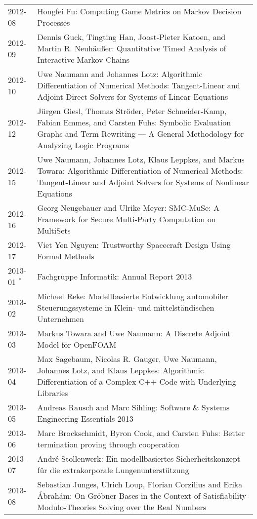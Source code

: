 \documentclass[color]{aib}
\begin{document}
\begin{longtable}{lp{11cm}}
2012-08 & Hongfei Fu:         Computing Game Metrics on Markov Decision Processes\\
2012-09 & Dennis Guck, Tingting Han, Joost-Pieter Katoen, and Martin R. Neuh\"{a}u\ss{}er:         Quantitative Timed Analysis of Interactive Markov Chains\\
2012-10 & Uwe Naumann and Johannes Lotz:         Algorithmic Differentiation of Numerical Methods: Tangent-Linear and Adjoint Direct Solvers for Systems of Linear Equations\\
2012-12 & J\"{u}rgen Giesl, Thomas Str\"{o}der, Peter Schneider-Kamp, Fabian Emmes, and Carsten Fuhs:         Symbolic Evaluation Graphs and Term Rewriting --- A General Methodology for Analyzing Logic Programs\\
2012-15 & Uwe Naumann, Johannes Lotz, Klaus Leppkes, and Markus Towara:         Algorithmic Differentiation of Numerical Methods: Tangent-Linear and Adjoint Solvers for Systems of Nonlinear Equations\\
2012-16 & Georg Neugebauer and Ulrike Meyer:         SMC-MuSe: A Framework for Secure Multi-Party Computation on MultiSets\\
2012-17 & Viet Yen Nguyen:         Trustworthy Spacecraft Design Using Formal Methods\\
2013-01 $^\ast$ &Fachgruppe Informatik:      Annual Report 2013\\
2013-02 & Michael Reke:         Modellbasierte Entwicklung automobiler Steuerungssysteme in Klein- und mittelst\"{a}ndischen Unternehmen\\
2013-03 & Markus Towara and Uwe Naumann:         A Discrete Adjoint Model for OpenFOAM\\
2013-04 & Max Sagebaum, Nicolas R. Gauger, Uwe Naumann, Johannes Lotz, and Klaus Leppkes:         Algorithmic Differentiation of a Complex C++ Code with Underlying Libraries\\
2013-05 & Andreas Rausch and Marc Sihling:         Software \& Systems Engineering Essentials 2013\\
2013-06 & Marc Brockschmidt, Byron Cook, and Carsten Fuhs:         Better termination proving through cooperation\\
2013-07 & Andr\'{e} Stollenwerk:         Ein modellbasiertes Sicherheitskonzept f\"{u}r die extrakorporale Lungenunterst\"{u}tzung\\
2013-08 & Sebastian Junges, Ulrich Loup, Florian Corzilius and Erika \'{A}brah\'{a}m:         On Gr\"{o}bner Bases in the Context of Satisfiability-Modulo-Theories Solving over the Real Numbers\\

\end{longtable}
\end{document}
